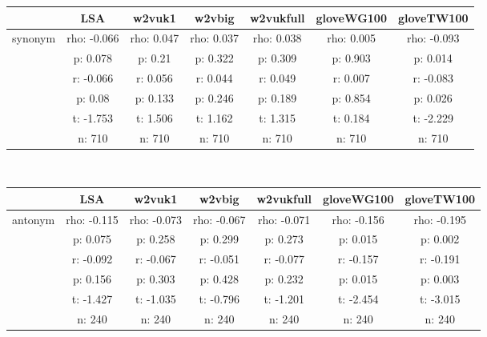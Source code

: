 \documentclass{article}
\begin{document}
\begin{tabular}{ccccccc|}\cline{2-7}
&\multicolumn{1}{|c}{LSA} & w2vuk1 & w2vbig & w2vukfull & gloveWG100 & gloveTW100 \\\hline
\multicolumn{1}{|c|}{\multirow{6}{*}{synonym}} & rho: -0.066 & rho: 0.047 & rho: 0.037 & rho: 0.038 & rho: 0.005 & rho: -0.093 \\
\multicolumn{1}{|c|}{} & p: 0.078 & p: 0.21 & p: 0.322 & p: 0.309 & p: 0.903 & p: 0.014 \\
\multicolumn{1}{|c|}{} & r: -0.066 & r: 0.056 & r: 0.044 & r: 0.049 & r: 0.007 & r: -0.083 \\
\multicolumn{1}{|c|}{} & p: 0.08 & p: 0.133 & p: 0.246 & p: 0.189 & p: 0.854 & p: 0.026 \\
\multicolumn{1}{|c|}{} & t: -1.753 & t: 1.506 & t: 1.162 & t: 1.315 & t: 0.184 & t: -2.229 \\
\multicolumn{1}{|c|}{} & n: 710 & n: 710 & n: 710 & n: 710 & n: 710 & n: 710 \\
\hline
\end{tabular}\\
\begin{tabular}{ccccccc|}\cline{2-7}
&\multicolumn{1}{|c}{LSA} & w2vuk1 & w2vbig & w2vukfull & gloveWG100 & gloveTW100 \\\hline
\multicolumn{1}{|c|}{\multirow{6}{*}{antonym}} & rho: -0.115 & rho: -0.073 & rho: -0.067 & rho: -0.071 & rho: -0.156 & rho: -0.195 \\
\multicolumn{1}{|c|}{} & p: 0.075 & p: 0.258 & p: 0.299 & p: 0.273 & p: 0.015 & p: 0.002 \\
\multicolumn{1}{|c|}{} & r: -0.092 & r: -0.067 & r: -0.051 & r: -0.077 & r: -0.157 & r: -0.191 \\
\multicolumn{1}{|c|}{} & p: 0.156 & p: 0.303 & p: 0.428 & p: 0.232 & p: 0.015 & p: 0.003 \\
\multicolumn{1}{|c|}{} & t: -1.427 & t: -1.035 & t: -0.796 & t: -1.201 & t: -2.454 & t: -3.015 \\
\multicolumn{1}{|c|}{} & n: 240 & n: 240 & n: 240 & n: 240 & n: 240 & n: 240 \\
\hline
\end{tabular}\\
\end{document}

